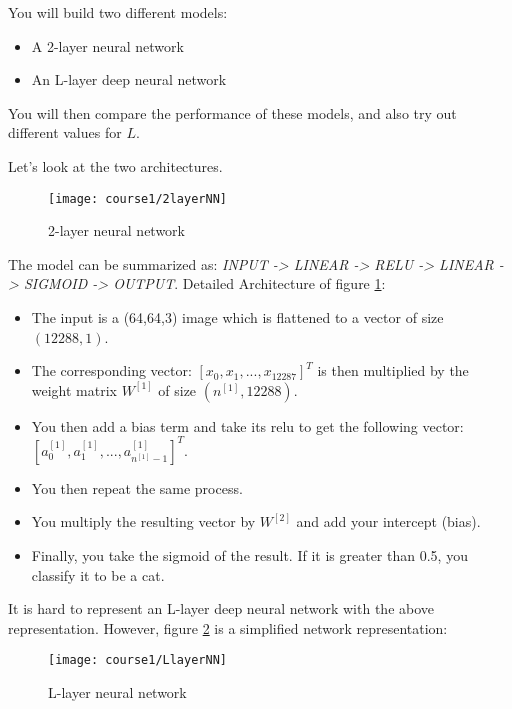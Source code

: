 You will build two different models:
\begin{itemize}
\item A 2-layer neural network
\item An L-layer deep neural network
\end{itemize}

You will then compare the performance of these models, and also try out different values for $L$. 

Let's look at the two architectures.


\begin{figure}[h]
\begin{center}
\texttt{[image: course1/2layerNN]}
\caption{2-layer neural network}
\label{2layerNN}
\end{center}
\end{figure}

The model can be summarized as: \emph{INPUT -> LINEAR -> RELU -> LINEAR -> SIGMOID -> OUTPUT}. Detailed Architecture of figure \ref{2layerNN}:
\begin{itemize}
\item The input is a (64,64,3) image which is flattened to a vector of size $(12288,1)$. 
\item The corresponding vector: $[x_0,x_1,...,x_{12287}]^T$ is then multiplied by the weight matrix $W^{[1]}$ of size $(n^{[1]}, 12288)$.
\item You then add a bias term and take its relu to get the following vector: $[a_0^{[1]}, a_1^{[1]},..., a_{n^{[1]}-1}^{[1]}]^T$.
\item You then repeat the same process.
\item You multiply the resulting vector by $W^{[2]}$ and add your intercept (bias). 
\item Finally, you take the sigmoid of the result. If it is greater than 0.5, you classify it to be a cat.
\end{itemize}




It is hard to represent an L-layer deep neural network with the above representation. However, figure \ref{LlayerNN} is a simplified network representation:
\begin{figure}[h]
\begin{center}
\texttt{[image: course1/LlayerNN]}
\caption{ L-layer neural network}
\label{LlayerNN}
\end{center}
\end{figure}



